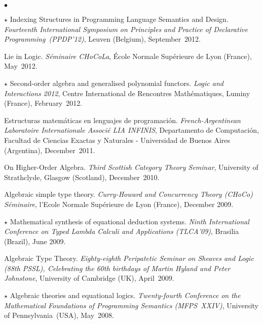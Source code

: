 \documentclass[11pt,twocolumn]{article}
\newenvironment{mybigitemize}
  {\begin{list}{$\bullet$}
  {\setlength{\topsep}{2pt}
   \setlength{\partopsep}{2pt}
   \setlength{\itemsep}{2.5pt}
   \setlength{\parsep}{2.5pt}
   \setlength{\leftmargin}{1em}
   \setlength{\labelwidth}{.5em}}}
  {\end{list}}
\begin{document}
\begin{mybigitemize}
\item[$\star$]
  Indexing Structures in Programming Language Semantics and Design.
  \emph{Fourteenth International Symposium on Principles and Practice of
    Declarative Programming~(PPDP'12)}, 
  Leuven (Belgium), September~2012.

\item
  Lie in Logic.  \emph{S\'{e}minaire CHoCoLa}, \'Ecole Normale Sup\'erieure de
  Lyon (France), May~2012.

\item[$\star$]
  Second-order algebra and generalised polynomial functors.  \emph{Logic and
    Interactions 2012}, Centre International de Rencontres Math\'{e}matiques,
  Luminy (France), February~2012.

\item
  Estructuras matem\'{a}ticas en lenguajes de programaci\'{o}n.
  \emph{French-Argentinean Laboratoire Internationale Associ\'e LIA INFINIS},
  Departamento de Computaci\'{o}n, Facultad de Ciencias Exactas y Naturales -
  Universidad de Buenos Aires (Argentina), December~2011.

\item
  On Higher-Order Algebra.   \emph{Third Scottish Category Theory Seminar},
  University of Strathclyde, Glasgow (Scotland), December~2010.

\item
  Algebraic simple type theory.  \emph{Curry-Howard and Concurrency Theory
    (CHoCo) S\'eminaire}, l'Ecole Normale Sup\'erieure de Lyon (France),
  December 2009.

\item[$\star$]
  Mathematical synthesis of equational deduction systems.  \emph{Ninth
    International Conference on Typed Lambda Calculi and Applications
    (TLCA'09)}, Brasilia (Brazil), June 2009.  

\item
  Algebraic Type Theory.  \emph{Eighty-eighth Peripatetic Seminar on Sheaves
    and Logic (88th PSSL), Celebrating the 60th birthdays of Martin Hyland and
    Peter Johnstone}, University of Cambridge (UK), April~2009.

\item[$\star$]
  Algebraic theories and equational logics.  \emph{Twenty-fourth Conference on
    the Mathematical Foundations of Programming Semantics (MFPS~XXIV)},
  University of Pennsylvania~(USA), May~2008.  


\end{mybigitemize}
\end{document}
